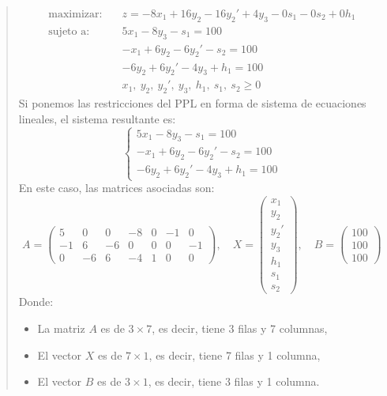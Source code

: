 \begin{quote}
  \label{ej:solucion_basica}
  \begin{align*}
    \text{maximizar:} \quad   &z = -8x_1 + 16y_2 - 16y_2' + 4y_3 - 0s_1 - 0s_2 + 0h_1 \\[3pt]
    \text{sujeto a:} \quad    &5x_1 - 8y_3 - s_1 = 100 \\
                              &-x_1 + 6y_2 - 6y_2' - s_2 = 100 \\
                              &-6y_2 + 6y_2' - 4y_3 + h_1 = 100 \\
                              &x_1,\ y_2,\ y_2',\ y_3,\ h_1,\ s_1,\ s_2 \geq 0
  \end{align*}
  Si ponemos las restricciones del PPL en forma de sistema de ecuaciones lineales, el sistema resultante es:
  \[
    \begin{cases}
      5x_1 - 8y_3 - s_1 = 100 \\
      -x_1 + 6y_2 - 6y_2' - s_2 = 100 \\
      -6y_2 + 6y_2' - 4y_3 + h_1 = 100
    \end{cases}
  \]
  En este caso, las matrices asociadas son:
  \[
    A = \begin{pmatrix}
      5 & 0 & 0 & -8 & 0 & -1 & 0 \\
      -1 & 6 & -6 & 0 & 0 & 0 & -1 \\
      0 & -6 & 6 & -4 & 1 & 0 & 0
    \end{pmatrix},\quad
    X = \begin{pmatrix}
      x_1 \\ y_2 \\ y_2' \\ y_3 \\ h_1 \\ s_1 \\ s_2
    \end{pmatrix},\quad
    B = \begin{pmatrix}
      100 \\ 100 \\ 100
    \end{pmatrix}
  \]
  Donde:
  \begin{itemize}
    \item La matriz \(A\) es de \(3 \times 7\), es decir, tiene 3 filas y 7 columnas,
    \item El vector \(X\) es de \(7 \times 1\), es decir, tiene 7 filas y 1 columna,
    \item El vector \(B\) es de \(3 \times 1\), es decir, tiene 3 filas y 1 columna.

\end{itemize}
\end{quote}
